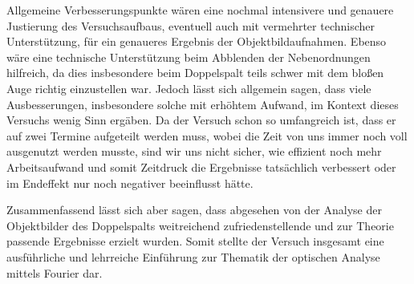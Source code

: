 \documentclass{article}
\begin{document}
Allgemeine Verbesserungspunkte wären eine nochmal intensivere und genauere Justierung des Versuchsaufbaus, eventuell auch mit vermehrter technischer Unterstützung, für ein genaueres Ergebnis der Objektbildaufnahmen. Ebenso wäre eine technische Unterstützung beim Abblenden der Nebenordnungen hilfreich, da dies insbesondere beim Doppelspalt teils schwer mit dem bloßen Auge richtig einzustellen war. Jedoch lässt sich allgemein sagen, dass viele Ausbesserungen, insbesondere solche mit erhöhtem Aufwand, im Kontext dieses Versuchs wenig Sinn ergäben. Da der Versuch schon so umfangreich ist, dass er auf zwei Termine aufgeteilt werden muss, wobei die Zeit von uns immer noch voll ausgenutzt werden musste, sind wir uns nicht sicher, wie effizient noch mehr Arbeitsaufwand und somit Zeitdruck die Ergebnisse tatsächlich verbessert oder im Endeffekt nur noch negativer beeinflusst hätte. 

Zusammenfassend lässt sich aber sagen, dass abgesehen von der Analyse der Objektbilder des Doppelspalts weitreichend zufriedenstellende und zur Theorie passende Ergebnisse erzielt wurden. Somit stellte der Versuch insgesamt eine ausführliche und lehrreiche Einführung zur Thematik der optischen Analyse mittels Fourier dar. 




\newpage

\end{document}
